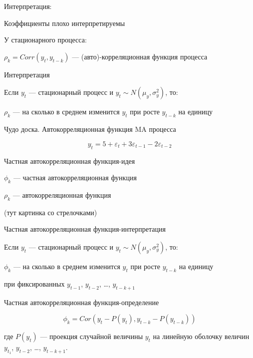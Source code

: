 \documentclass[ignorenonframetext,]{beamer}
\begin{document}
\begin{frame}{Интерпретация:}

Коэффициенты плохо интерпретируемы

У стационарного процесса:

$\rho_k=Corr(y_t, y_{t-k})$ --- (авто)-корреляционная функция процесса

\end{frame}

\begin{frame}{Интерпретация}

Если $y_t$ --- стационарный процесс и $y_t \sim N(\mu_y, \sigma^2_y)$,
то:

$\rho_k$ --- на сколько в среднем изменится $y_{t}$ при росте $y_{t-k}$
на единицу

\end{frame}

\begin{frame}{Чудо доска. Автокорреляционная функция MA процесса}

\[
y_t = 5 + \varepsilon_t + 3 \varepsilon_{t-1} -2\varepsilon_{t-2}
\]

\end{frame}

\begin{frame}{Частная автокорреляционная функция-идея}

$\phi_k$ --- частная автокорреляционная функция

$\rho_k$ --- автокорреляционная функция

(тут картинка со стрелочками)

\end{frame}

\begin{frame}{Частная автокорреляционная функция-интерпретация}

Если $y_t$ --- стационарный процесс и $y_t \sim N(\mu_y, \sigma^2_y)$,
то:

$\phi_k$ --- на сколько в среднем изменится $y_{t}$ при росте $y_{t-k}$
на единицу

при фиксированных $y_{t-1}$, $y_{t-2}$, \ldots, $y_{t-k+1}$

\end{frame}

\begin{frame}{Частная автокорреляционная функция-определение}

\[
\phi_{k}=Cor(y_t - P(y_t), y_{t-k} - P(y_{t-k}))
\]

где $P(y_t)$ --- проекция случайной величины $y_t$ на линейную оболочку
величин $y_{t_1}$, $y_{t-2}$, \ldots, $y_{t-k+1}$.

\end{frame}
\end{document}
